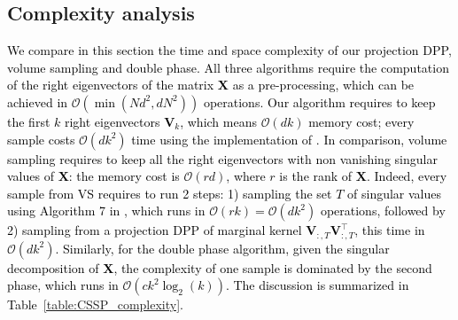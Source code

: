 \documentclass[twoside,11pt]{book}
\newcommand{\rev}[1]{\textcolor{black}{#1}}
\numberwithin{theorem}{chapter}
\numberwithin{definition}{chapter}
\numberwithin{proposition}{chapter}
\numberwithin{corollary}{chapter}
\numberwithin{example}{chapter}
\numberwithin{lemma}{chapter}
\numberwithin{assumption}{chapter}
\numberwithin{equation}{chapter}
\numberwithin{figure}{chapter}
\DeclareMathOperator{\Tran}{\intercal}
\begin{document}
\subsection{Complexity analysis}\label{sec:complexity}
\rev{We compare in this section the time and space complexity of our projection DPP, volume sampling and double phase.
All three algorithms require the computation of the right eigenvectors of the matrix $\bm{X}$ as a pre-processing, which can be achieved in $\mathcal{O}(\min(N d^{2},dN^{2}))$ operations.
Our algorithm requires to keep the first $k$ right eigenvectors $\bm{V}_{k}$, which means $\mathcal{O}(dk)$ memory cost; every sample costs $\mathcal{O}(dk^{2})$ time using the implementation of \cite{TrBaAm18}.}
\rev{In comparison, volume sampling requires to keep all the right eigenvectors with non vanishing singular values of $\bm{X}$: the memory cost is $\mathcal{O}(r d)$, where $r$ is the rank of $\bm{X}$.
Indeed, every sample from VS requires to run 2 steps: 1) sampling the set $T$ of singular values using Algorithm 7 in \parencite{KuTa12}, which runs in $\mathcal{O}(rk) = \mathcal{O}(dk^{2})$ operations, followed by 2) sampling from a projection DPP of marginal kernel $\bm{V}_{:,T}^{\phantom{\Tran}}\bm{V}_{:,T}^{\Tran}$, this time in $\mathcal{O}(dk^{2})$.
%
Similarly, for the double phase algorithm, given the singular decomposition of $\bm{X}$, the complexity of one sample is dominated by the second phase, which runs in $\mathcal{O}(c k^{2} \log_{2}(k))$. The discussion is summarized in Table~\ref{table:CSSP_complexity}.}
\end{document}

